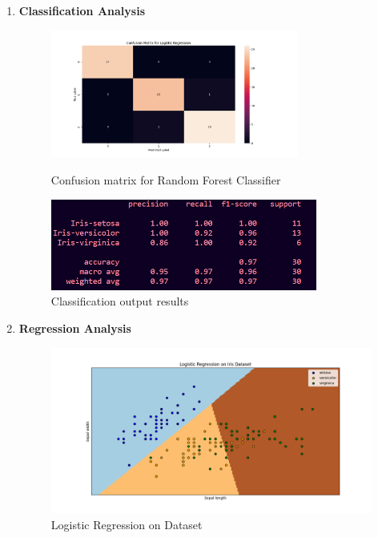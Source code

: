 \documentclass[a4paper]{article}
\begin{document}
\begin{enumerate}
	\item \textbf{Classification Analysis}
\begin{figure}[h]
	\begin{minipage}{0.32\textwidth}
		\centering
		\includegraphics[height=4.2cm]{picture/LR2} %
		\caption{Confusion matrix for Random Forest Classifier}
		\label{fig:setosa}
	\end{minipage}\hspace{3cm}
	\begin{minipage}{0.32\textwidth}
		\centering
		\includegraphics[height=3cm]{picture/LR3} %
		\caption{Classification output results}
		\label{fig:versicolour}
	\end{minipage}\hfill
\end{figure}
	\item \textbf{Regression Analysis}
	\begin{figure}[h]
		\centering
		\includegraphics[width=1\textwidth]{picture/LR4}
		\caption{Logistic Regression on Dataset}
		\label{fig:logistic_regression}
	\end{figure}
\end{enumerate}
\end{document}
